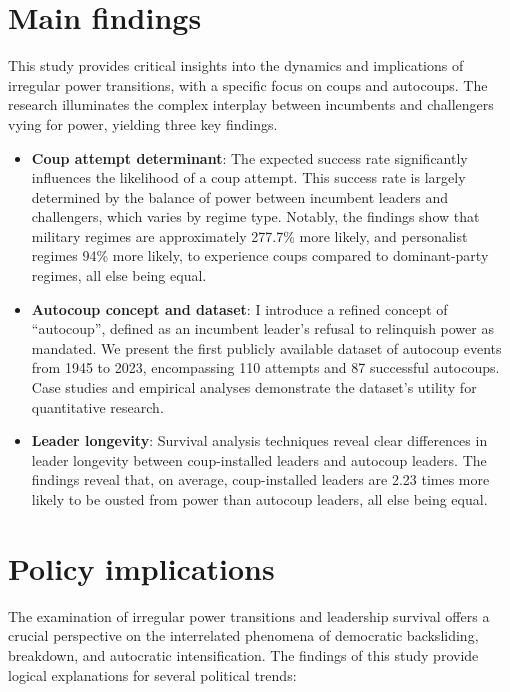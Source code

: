 \documentclass[
  12pt,
]{report}
\begin{document}
\section{Main findings}\label{main-findings}

This study provides critical insights into the dynamics and implications
of irregular power transitions, with a specific focus on coups and
autocoups. The research illuminates the complex interplay between
incumbents and challengers vying for power, yielding three key findings.

\begin{itemize}
\item
  \textbf{Coup attempt determinant}: The expected success rate
  significantly influences the likelihood of a coup attempt. This
  success rate is largely determined by the balance of power between
  incumbent leaders and challengers, which varies by regime type.
  Notably, the findings show that military regimes are approximately
  277.7\% more likely, and personalist regimes 94\% more likely, to
  experience coups compared to dominant-party regimes, all else being
  equal.
\item
  \textbf{Autocoup concept and dataset}: I introduce a refined concept
  of ``autocoup'', defined as an incumbent leader's refusal to
  relinquish power as mandated. We present the first publicly available
  dataset of autocoup events from 1945 to 2023, encompassing 110
  attempts and 87 successful autocoups. Case studies and empirical
  analyses demonstrate the dataset's utility for quantitative research.
\item
  \textbf{Leader longevity}: Survival analysis techniques reveal clear
  differences in leader longevity between coup-installed leaders and
  autocoup leaders. The findings reveal that, on average, coup-installed
  leaders are 2.23 times more likely to be ousted from power than
  autocoup leaders, all else being equal.
\end{itemize}

\section{Policy implications}\label{policy-implications-1}

The examination of irregular power transitions and leadership survival
offers a crucial perspective on the interrelated phenomena of democratic
backsliding, breakdown, and autocratic intensification. The findings of
this study provide logical explanations for several political trends:
\end{document}
